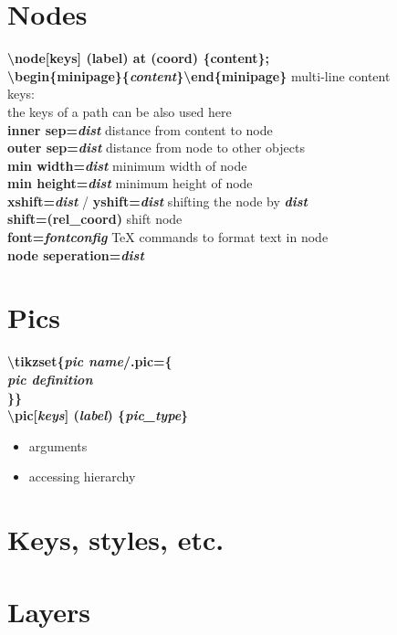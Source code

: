 \documentclass[10pt]{article}
\newcommand{\tikzcmd}[1]{\textbf{#1}}
\newcommand{\tikzparam}[1]{\textbf{\emph{#1}}}
\begin{document}
\begin{multicols}{2}
        \section{Nodes}
        \tikzcmd{\textbackslash node[keys] (label) at (coord) \{content\};}\\
        \tikzcmd{\textbackslash begin\{minipage\}\{\tikzparam{content}\}\textbackslash end\{minipage\} } multi-line content\\
        keys:\\
        the keys of a path can be also used here\\
        \tikzcmd{inner sep=\tikzparam{dist}} distance from content to node\\
        \tikzcmd{outer sep=\tikzparam{dist}} distance from node to other objects\\
        \tikzcmd{min width=\tikzparam{dist}} minimum width of node\\
        \tikzcmd{min height=\tikzparam{dist}} minimum height of node\\
        \tikzcmd{xshift=\tikzparam{dist}} / \tikzcmd{yshift=\tikzparam{dist}} shifting the node by \tikzparam{dist}\\
        \tikzcmd{shift=(rel\_coord)} shift node\\
        \tikzcmd{font=\tikzparam{fontconfig}} TeX commands to format text in node\\
        \tikzcmd{node seperation=\tikzparam{dist}}

        \section{Pics}
        \tikzcmd{\textbackslash tikzset\{\tikzparam{pic name}/.pic=\{\\
           \tikzparam{pic definition}\\
        \}\}}\\
        \tikzcmd{\textbackslash pic[\tikzparam{keys}] (\tikzparam{label}) \{\tikzparam{pic\_type}\} }
        \begin{itemize}

            \item arguments
            \item accessing hierarchy
        \end{itemize}

        \section{Keys, styles, etc.}

        \section{Layers}

    \end{multicols}
\end{document}
